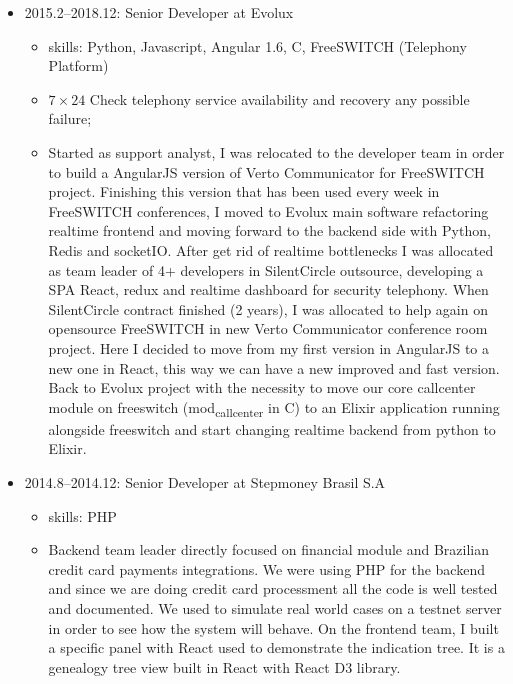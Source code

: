 \documentclass[
]{article}
\providecommand{\tightlist}{%
  \setlength{\itemsep}{0pt}\setlength{\parskip}{0pt}}
\begin{document}
\begin{itemize}
\tightlist
\item
  2015.2--2018.12: Senior Developer at Evolux

  \begin{itemize}
  \tightlist
  \item
    skills: Python, Javascript, Angular 1.6, C, FreeSWITCH (Telephony
    Platform)
  \item
    \(7 \times 24\) Check telephony service availability and recovery
    any possible failure;
  \item
    Started as support analyst, I was relocated to the developer team in
    order to build a AngularJS version of Verto Communicator for
    FreeSWITCH project. Finishing this version that has been used every
    week in FreeSWITCH conferences, I moved to Evolux main software
    refactoring realtime frontend and moving forward to the backend side
    with Python, Redis and socketIO. After get rid of realtime
    bottlenecks I was allocated as team leader of 4+ developers in
    SilentCircle outsource, developing a SPA React, redux and realtime
    dashboard for security telephony. When SilentCircle contract
    finished (2 years), I was allocated to help again on opensource
    FreeSWITCH in new Verto Communicator conference room project. Here I
    decided to move from my first version in AngularJS to a new one in
    React, this way we can have a new improved and fast version. Back to
    Evolux project with the necessity to move our core callcenter module
    on freeswitch (mod\textsubscript{callcenter} in C) to an Elixir
    application running alongside freeswitch and start changing realtime
    backend from python to Elixir.
  \end{itemize}
\end{itemize}

\vspace{2mm}

\begin{itemize}
\tightlist
\item
  2014.8--2014.12: Senior Developer at Stepmoney Brasil S.A

  \begin{itemize}
  \tightlist
  \item
    skills: PHP
  \item
    Backend team leader directly focused on financial module and
    Brazilian credit card payments integrations. We were using PHP for
    the backend and since we are doing credit card processment all the
    code is well tested and documented. We used to simulate real world
    cases on a testnet server in order to see how the system will
    behave. On the frontend team, I built a specific panel with React
    used to demonstrate the indication tree. It is a genealogy tree view
    built in React with React D3 library.
  \end{itemize}
\end{itemize}
\end{document}
